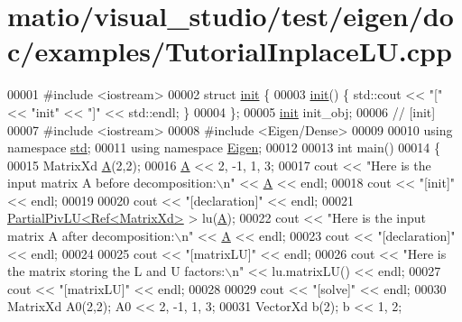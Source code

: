 \hypertarget{matio_2visual__studio_2test_2eigen_2doc_2examples_2_tutorial_inplace_l_u_8cpp_source}{}\section{matio/visual\+\_\+studio/test/eigen/doc/examples/\+Tutorial\+Inplace\+LU.cpp}
\label{matio_2visual__studio_2test_2eigen_2doc_2examples_2_tutorial_inplace_l_u_8cpp_source}

\begin{DoxyCode}
00001 \textcolor{preprocessor}{#include <iostream>}
00002 \textcolor{keyword}{struct }\hyperlink{structinit}{init} \{
00003   \hyperlink{structinit}{init}() \{ std::cout << \textcolor{stringliteral}{"["} << \textcolor{stringliteral}{"init"} << \textcolor{stringliteral}{"]"} << std::endl; \}
00004 \};
00005 \hyperlink{structinit}{init} init\_obj;
00006 \textcolor{comment}{// [init]}
00007 \textcolor{preprocessor}{#include <iostream>}
00008 \textcolor{preprocessor}{#include <Eigen/Dense>}
00009 
00010 \textcolor{keyword}{using namespace }\hyperlink{namespacestd}{std};
00011 \textcolor{keyword}{using namespace }\hyperlink{namespace_eigen}{Eigen};
00012 
00013 \textcolor{keywordtype}{int} main()
00014 \{
00015   MatrixXd \hyperlink{group___core___module_class_eigen_1_1_matrix}{A}(2,2);
00016   \hyperlink{group___core___module_class_eigen_1_1_matrix}{A} << 2, -1, 1, 3;
00017   cout << \textcolor{stringliteral}{"Here is the input matrix A before decomposition:\(\backslash\)n"} << \hyperlink{group___core___module_class_eigen_1_1_matrix}{A} << endl;
00018 cout << \textcolor{stringliteral}{"[init]"} << endl;
00019 
00020 cout << \textcolor{stringliteral}{"[declaration]"} << endl;
00021   \hyperlink{group___l_u___module_class_eigen_1_1_partial_piv_l_u}{PartialPivLU<Ref<MatrixXd>} > lu(\hyperlink{group___core___module_class_eigen_1_1_matrix}{A});
00022   cout << \textcolor{stringliteral}{"Here is the input matrix A after decomposition:\(\backslash\)n"} << \hyperlink{group___core___module_class_eigen_1_1_matrix}{A} << endl;
00023 cout << \textcolor{stringliteral}{"[declaration]"} << endl;
00024 
00025 cout << \textcolor{stringliteral}{"[matrixLU]"} << endl;
00026   cout << \textcolor{stringliteral}{"Here is the matrix storing the L and U factors:\(\backslash\)n"} << lu.matrixLU() << endl;
00027 cout << \textcolor{stringliteral}{"[matrixLU]"} << endl;
00028 
00029 cout << \textcolor{stringliteral}{"[solve]"} << endl;
00030   MatrixXd A0(2,2); A0 << 2, -1, 1, 3;
00031   VectorXd b(2);    b << 1, 2;

\end{DoxyCode}

